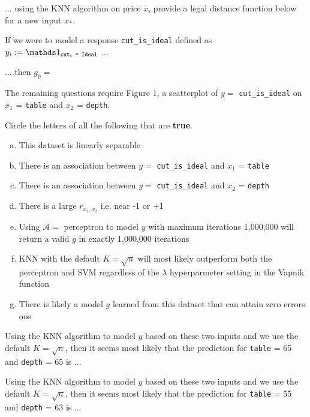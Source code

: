 \documentclass[12pt]{article}
\begin{document}
 ... using the KNN algorithm on price $x$, provide a legal distance function below for a new input $x_*$.  

If we were to model a response \texttt{cut\_is\_ideal} defined as $y_i :=\indic{\texttt{cut$_i$ = Ideal}}$ ...

 ... then $g_0 = $ 

The remaining questions require Figure 1, a scatterplot of $y = $ \texttt{cut\_is\_ideal} on $x_1$ = \texttt{table} and $x_2$ = \texttt{depth}.

%	
%	

 Circle the letters of all the following that are \textbf{true}.

\begin{enumerate}[(a)]
\item This dataset is linearly separable
\item  There is an association between $y = $ \texttt{cut\_is\_ideal} and $x_1$ = \texttt{table}
\item There is an association between $y = $ \texttt{cut\_is\_ideal} and $x_2$ = \texttt{depth}
\item There is a large $r_{x_1, x_2}$ i.e. near -1 or +1
\item Using $\mathcal{A} = $ perceptron to model $y$ with maximum iterations 1,000,000 will return a valid $g$ in exactly 1,000,000 iterations
\item KNN with the default $K = \sqrt{n}$ will most likely outperform both the perceptron and SVM regardless of the $\lambda$ hyperparmeter setting in the Vapnik function
\item There is likely a model $g$ learned from this dataset that can attain zero errors oos
\end{enumerate}

 Using the KNN algorithm to model $y$ based on these two inputs and we use the default $K = \sqrt{n}$, then it seems most likely that the prediction for  \texttt{table} = 65 and \texttt{depth} = 65 is ... 

 Using the KNN algorithm to model $y$ based on these two inputs and we use the default $K = \sqrt{n}$, then it seems most likely that the prediction for  \texttt{table} = 55 and \texttt{depth} = 63 is ... 
\end{document}
